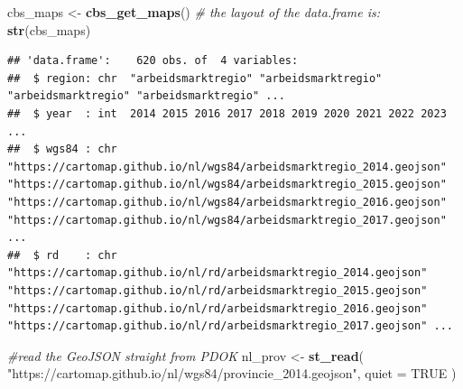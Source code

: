 \documentclass[
]{article}
\newenvironment{Shaded}{\begin{snugshade}}{\end{snugshade}}
\newcommand{\AttributeTok}[1]{\textcolor[rgb]{0.13,0.29,0.53}{#1}}
\newcommand{\CommentTok}[1]{\textcolor[rgb]{0.56,0.35,0.01}{\textit{#1}}}
\newcommand{\ConstantTok}[1]{\textcolor[rgb]{0.56,0.35,0.01}{#1}}
\newcommand{\DecValTok}[1]{\textcolor[rgb]{0.00,0.00,0.81}{#1}}
\newcommand{\FunctionTok}[1]{\textcolor[rgb]{0.13,0.29,0.53}{\textbf{#1}}}
\newcommand{\NormalTok}[1]{#1}
\newcommand{\OtherTok}[1]{\textcolor[rgb]{0.56,0.35,0.01}{#1}}
\newcommand{\SpecialCharTok}[1]{\textcolor[rgb]{0.81,0.36,0.00}{\textbf{#1}}}
\newcommand{\StringTok}[1]{\textcolor[rgb]{0.31,0.60,0.02}{#1}}
\begin{document}
\begin{Shaded}
\begin{Highlighting}[]
\NormalTok{cbs\_maps }\OtherTok{\textless{}{-}} \FunctionTok{cbs\_get\_maps}\NormalTok{()}
\CommentTok{\# the layout of the data.frame is:}
\FunctionTok{str}\NormalTok{(cbs\_maps)}
\end{Highlighting}
\end{Shaded}

\begin{verbatim}
## 'data.frame':    620 obs. of  4 variables:
##  $ region: chr  "arbeidsmarktregio" "arbeidsmarktregio" "arbeidsmarktregio" "arbeidsmarktregio" ...
##  $ year  : int  2014 2015 2016 2017 2018 2019 2020 2021 2022 2023 ...
##  $ wgs84 : chr  "https://cartomap.github.io/nl/wgs84/arbeidsmarktregio_2014.geojson" "https://cartomap.github.io/nl/wgs84/arbeidsmarktregio_2015.geojson" "https://cartomap.github.io/nl/wgs84/arbeidsmarktregio_2016.geojson" "https://cartomap.github.io/nl/wgs84/arbeidsmarktregio_2017.geojson" ...
##  $ rd    : chr  "https://cartomap.github.io/nl/rd/arbeidsmarktregio_2014.geojson" "https://cartomap.github.io/nl/rd/arbeidsmarktregio_2015.geojson" "https://cartomap.github.io/nl/rd/arbeidsmarktregio_2016.geojson" "https://cartomap.github.io/nl/rd/arbeidsmarktregio_2017.geojson" ...
\end{verbatim}

\begin{Shaded}
\begin{Highlighting}[]
\CommentTok{\#read the GeoJSON straight from PDOK }
\NormalTok{nl\_prov }\OtherTok{\textless{}{-}} \FunctionTok{st\_read}\NormalTok{(}
  \StringTok{"https://cartomap.github.io/nl/wgs84/provincie\_2014.geojson"}\NormalTok{,}
  \AttributeTok{quiet =} \ConstantTok{TRUE}
\NormalTok{)}
\end{Highlighting}
\end{Shaded}

\begin{Shaded}
\end{Shaded}
\end{document}
